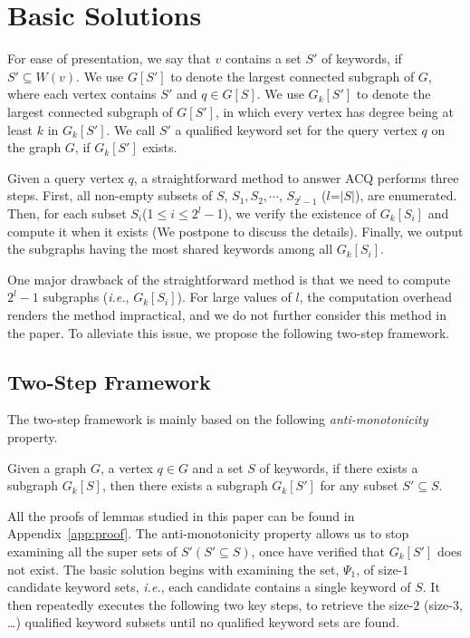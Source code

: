 \section{Basic Solutions}
\label{basic}

For ease of presentation, we say that $v$ contains a set $S'$ of keywords, if $S'\subseteq W(v)$.
We use $G[S']$ to denote the largest connected subgraph of $G$,
where each vertex contains $S'$ and $q\in G[S]$.
We use $G_k[S']$ to denote the largest connected subgraph of $G[S']$,
in which every vertex has degree being at least $k$ in $G_k[S']$.
We call $S'$ a qualified keyword set for the query vertex $q$ on the graph $G$, if $G_k[S']$ exists.

Given a query vertex $q$, a straightforward method to answer ACQ performs three steps.
First, all non-empty subsets of $S$, $S_1,S_2,\cdots$, $S_{2^l-1}$ ($l$=$|S|$), are enumerated.
Then, for each subset $S_i$(1$\leq i\leq2^l-$1), we verify the existence of $G_k[S_i]$ and compute it when it exists (We postpone to discuss the details). Finally, we output the subgraphs having the most shared keywords among all $G_k[S_i]$.

One major drawback of the straightforward method is that we need to compute $2^l-1$ subgraphs (\textit{i.e.}, $G_k[S_i]$).
For large values of $l$, the computation overhead renders the method impractical, and we do not further consider this method in the paper. To alleviate this issue, we propose the following two-step framework.

\subsection{Two-Step Framework}
The two-step framework is mainly based on the following \emph{anti-monotonicity} property.
\begin{lemma}
  \label{lemma:apriori}
  Given a graph $G$, a vertex $q\in G$ and a set $S$ of keywords, if there exists a subgraph $G_k[S]$,
  then there exists a subgraph $G_k[S']$ for any subset $S'\subseteq S$.
\end{lemma}

All the proofs of lemmas studied in this paper can be found in Appendix~\ref{app:proof}.
The anti-monotonicity property allows us to stop examining all the super sets of $S' (S'\subseteq S)$, once have verified that $G_k[S']$ does not exist.
The basic solution begins with examining the set, $\Psi_1$, of size-$1$ candidate keyword sets,
\textit{i.e.}, each candidate contains a single keyword of $S$.
It then repeatedly executes the following two key steps,
to retrieve the size-$2$ (size-$3$, \ldots) qualified keyword subsets until no qualified keyword sets are found.

